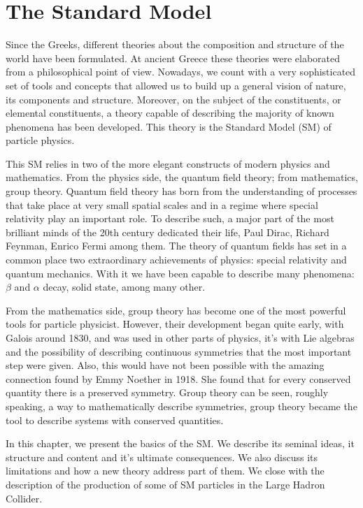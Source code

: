 \chapter[The Standard Model]{The Standard Model}
\label{chap:SM}
Since the Greeks, different theories about the composition and structure of the world have been formulated. At ancient Greece these theories were elaborated from a philosophical point of view. Nowadays, we count with a very sophisticated  set of tools and concepts that allowed us to build up a general vision of nature, its components and structure. Moreover, on the subject of the constituents, or elemental constituents, a theory capable of describing the majority of known phenomena has been developed. This theory is the Standard Model (SM) of particle physics. 

This SM relies in two of the more elegant constructs of modern physics and mathematics. From the physics side, the quantum field theory; from mathematics, group theory. Quantum field theory has born from the understanding of processes that take place at very small spatial scales and in a regime where special relativity play an important role. To describe such, a major part of the most brilliant minds of the 20th century dedicated their life, Paul Dirac, Richard Feynman, Enrico Fermi among them. The theory of quantum fields has set in a common place two extraordinary achievements of physics: special relativity and quantum mechanics. With it we have been capable to describe many phenomena: $\beta$ and $\alpha$ decay, solid state, among many other.

From the mathematics side, group theory has become one of the most powerful tools for particle physicist. However, their development began quite early, with Galois around 1830, and was used in other parts of physics, it's with Lie algebras and the possibility of describing continuous symmetries that the most important step were given. Also, this would have not been possible with the amazing connection found by Emmy Noether in 1918. She found that for every conserved quantity there is a preserved symmetry. Group theory can be seen, roughly speaking, a way to mathematically describe symmetries, group theory became the tool to describe systems with conserved quantities. 

In this chapter, we present the basics of the SM. We describe its seminal ideas, it structure and content and it's ultimate consequences. We also discuss its limitations and how a new theory address part of them. We close with the description of the production of some of SM particles in the Large Hadron Collider.  

